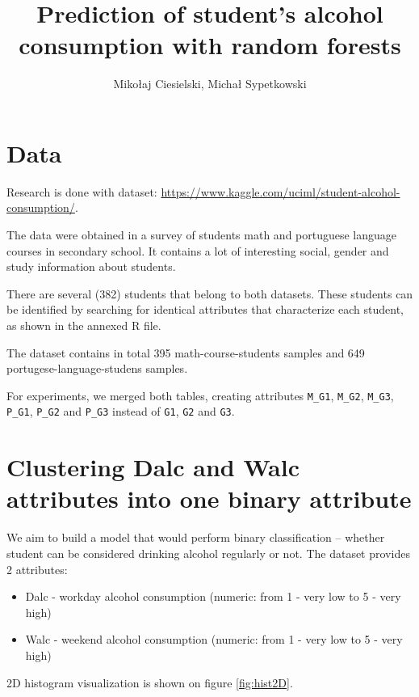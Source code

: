 \documentclass[a4paper]{article}
\begin{document}
\title{Prediction of student's alcohol consumption with random forests}

\author{Mikołaj Ciesielski, Michał Sypetkowski}
\maketitle


\begin{multicols}{2}

\section{Data}

Research is done with dataset: \url{https://www.kaggle.com/uciml/student-alcohol-consumption/}.

The data were obtained in a survey of students
math and portuguese language courses in secondary school.
It contains a lot of interesting social,
gender and study information about students.

There are several (382) students that belong to both datasets.
These students can be identified by searching for identical attributes
that characterize each student, as shown in the annexed R file.

The dataset contains in total 395 math-course-students samples and 
649 portugese-language-studens samples.

For experiments, we merged both tables, creating attributes
\texttt{M\_G1},
\texttt{M\_G2},
\texttt{M\_G3},
\texttt{P\_G1},
\texttt{P\_G2} and
\texttt{P\_G3} instead of
\texttt{G1}, \texttt{G2} and \texttt{G3}.

\section{Clustering Dalc and Walc attributes into one binary attribute}

We aim to build a model that would perform binary classification --
whether student can be considered drinking alcohol regularly or not.
The dataset provides 2 attributes:
\begin{itemize}
    \item Dalc - workday alcohol consumption (numeric: from 1 - very low to 5 - very high)
    \item Walc - weekend alcohol consumption (numeric: from 1 - very low to 5 - very high)
\end{itemize}
2D histogram visualization is shown on figure \ref{fig:hist2D}.


\end{multicols}
\end{document}
